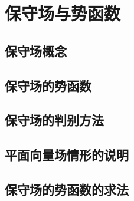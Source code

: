 \section{保守场与势函数}
\subsection{保守场概念}
\subsection{保守场的势函数}
\subsection{保守场的判别方法}
\subsection{平面向量场情形的说明}
\subsection{保守场的势函数的求法}
\begin{exercise}

\end{exercise}
\begin{exercise*}

\end{exercise*}


\endinput
